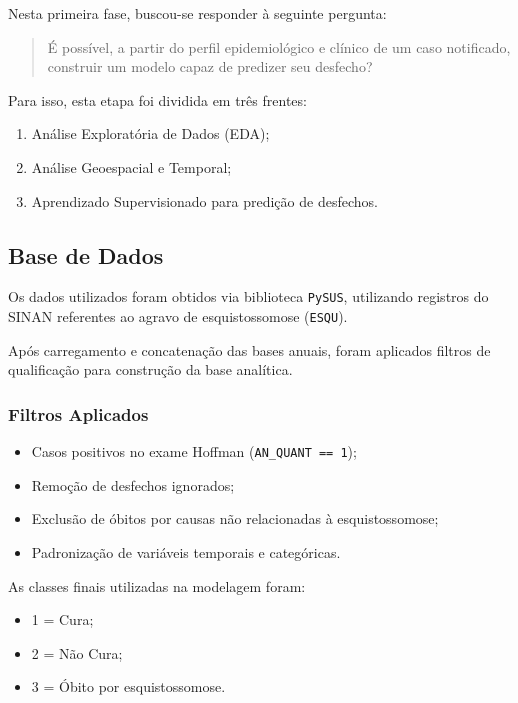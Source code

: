 \documentclass[12pt]{article}
\begin{document}
Nesta primeira fase, buscou-se responder à seguinte pergunta:

\begin{quote}
É possível, a partir do perfil epidemiológico e clínico de um caso notificado,
construir um modelo capaz de predizer seu desfecho?
\end{quote}

Para isso, esta etapa foi dividida em três frentes:

\begin{enumerate}
    \item Análise Exploratória de Dados (EDA);
    \item Análise Geoespacial e Temporal;
    \item Aprendizado Supervisionado para predição de desfechos.
\end{enumerate}

\subsection{Base de Dados}

Os dados utilizados foram obtidos via biblioteca \texttt{PySUS}, utilizando registros
do SINAN referentes ao agravo de esquistossomose (\texttt{ESQU}).

Após carregamento e concatenação das bases anuais, foram aplicados filtros de
qualificação para construção da base analítica.

\subsubsection{Filtros Aplicados}

\begin{itemize}
    \item Casos positivos no exame Hoffman (\texttt{AN\_QUANT == 1});
    \item Remoção de desfechos ignorados;
    \item Exclusão de óbitos por causas não relacionadas à esquistossomose;
    \item Padronização de variáveis temporais e categóricas.
\end{itemize}

As classes finais utilizadas na modelagem foram:

\begin{itemize}
    \item 1 = Cura;
    \item 2 = Não Cura;
    \item 3 = Óbito por esquistossomose.
\end{itemize}
\end{document}
